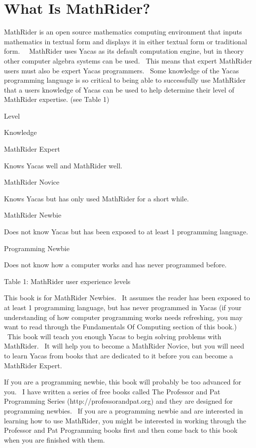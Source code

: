 \documentclass[12pt,twoside]{book}
\begin{document}
\section[What Is MathRider?]{What Is MathRider?}
MathRider is an open source mathematics computing environment that
inputs mathematics in textual form and displays it in either textual
form or traditional form. \ \ MathRider uses Yacas as its default
computation engine, but in theory other computer algebra systems can be
used. \ This means that expert MathRider users must also be expert
Yacas programmers. \ Some knowledge of the Yacas programming language
is so critical to being able to successfully use MathRider that a
user{\textquotesingle}s knowledge of Yacas can be used to help
determine their level of MathRider expertise. (see Table 1)


\bigskip

Level

Knowledge

MathRider Expert

Knows Yacas well and MathRider well.

MathRider Novice

Knows Yacas but has only used MathRider for a short while.

MathRider Newbie

Does not know Yacas but has been exposed to at least 1 programming
language.

Programming Newbie

Does not know how a computer works and has never programmed before.

Table 1: MathRider user experience levels


\bigskip

This book is for MathRider Newbies. \ It assumes the reader has been
exposed to at least 1 programming language, but has never programmed in
Yacas (if your understanding of how computer programming works needs
refreshing, you may want to read through the Fundamentals Of Computing
section of this book.) \ This book will teach you enough Yacas to begin
solving problems with MathRider. \ It will help you to become a
MathRider Novice, but you will need to learn Yacas from books that are
dedicated to it before you can become a MathRider Expert. \ 


\bigskip

If you are a programming newbie, this book will probably be too advanced
for you. \ I have written a series of free books called The Professor
and Pat Programming Series (http://professorandpat.org) and they are
designed for programming newbies. \ If you are a programming newbie and
are interested in learning how to use MathRider, you might be
interested in working through the Professor and Pat Programming books
first and then come back to this book when you are finished with them.
\ 
\end{document}
